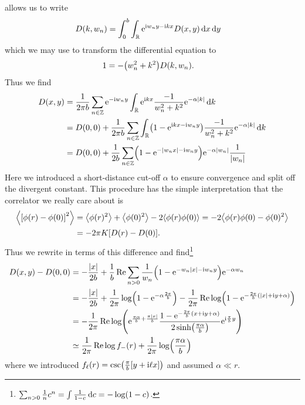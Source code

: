 \documentclass[english, parskip=full]{scrartcl}
\begin{document}
allows us to write
\begin{align}
D(k,w_n) &= \int_{0}^{b} \int_{\mathbb{R}} \text{e}^{\text{i} w_n y - \text{i} kx} D(x,y) \, \mathrm{d}x  \,\mathrm{d}y
\end{align}
which we may use to transform the differential equation to
\begin{align}
1 &= -\kla*{w_n^2 + k^2} D(k,w_n).
\end{align}
Thus we find
\begin{align}
D(x,y) &= \frac{1}{2\pi b} \sum_{n\in\mathbb{Z}} \powe{-\i w_n y} \intr{\powe{\i kx} \frac{-1}{w_n^2 + k^2} \powe{-\alpha |k|}}{k} \\
&= D(0,0) + \frac{1}{2\pi b} \sum_{n\in\mathbb{Z}} \intr{\kla*{1 - \powe{\i kx - \i w_ny}} \frac{-1}{w_n^2 + k^2} \powe{-\alpha |k|}}{k}\\
&= D(0,0) + \frac{1}{2b} \sum_{n\in\mathbb{Z}} \kla*{1 - \powe{- |w_n x| - \i w_ny}} \powe{-\alpha |w_n|} \frac{1}{|w_n|}
\end{align}
Here we introduced a short-distance cut-off $\alpha$ to ensure convergence and split off the divergent constant.
This procedure has the simple interpretation that the correlator we really care about is
\begin{align}
\bra*{\klb*{\phi(r) - \phi(0)}^2} &= \bra*{\phi(r)^2} + \bra*{\phi(0)^2} - 2\bra*{\phi(r) \phi(0)} = -2\bra*{\phi(r)\phi(0) - \phi(0)^2} \\
&= -2\pi K \klb*{D(r) - D(0)}.
\end{align}
Thus we rewrite in terms of this difference and find\footnote{$\sum_{n>0} \frac{1}{n} c^n = \int \frac{1}{1-c}\,\text{d} c = -\log(1-c)$.}
\begin{align}
D(x,y) - D(0,0) &= -\frac{|x|}{2b} + \frac{1}{b} \Re \sum_{n>0} \frac{1}{w_n} \kla*{1 - \powe{- w_n |x| - \i w_ny}} \powe{-\alpha w_n}\\
&= -\frac{|x|}{2b} + \frac{1}{2\pi} \log\kla*{1 - \powe{-\alpha \frac{2\pi}{b}}} - \frac{1}{2\pi} \Re \log\kla*{1 - \powe{-\frac{2\pi}{b} (|x| + \i y + \alpha)}}\\
&= -\frac{1}{2\pi} \Re \log \kla*{\powe{\frac{\pi\alpha}{b} + \frac{\pi |x|}{b}} \frac{1 - \powe{-\frac{2\pi}{b}(x+\i y+\alpha)}}{2\sinh\kla*{\frac{\pi\alpha}{b}}} \powe{\i\frac{\pi}{b}y} } \\
&\simeq \frac{1}{2\pi} \Re \log f_-(r) + \frac{1}{2\pi} \log \kla*{\frac{\pi\alpha}{b}}
\end{align}
where we introduced $f_\ell(r) = \csc\kla*{\frac{\pi}{b} \klb*{y + \i\ell x}}$ and assumed $\alpha \ll r$.
\end{document}
